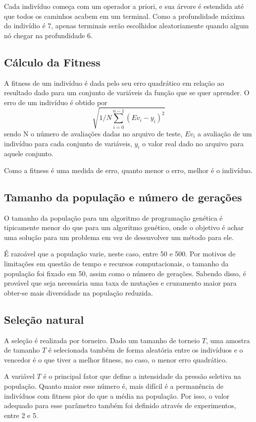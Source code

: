 \documentclass[11pt]{article}
\begin{document}
Cada indivíduo começa com um operador a priori, e sua árvore é estendida até que todos os caminhos acabem em um terminal. Como a profundidade máxima do indivídio é 7, apenas terminais serão escolhidos aleatoriamente quando algum nó chegar na profundidade 6.

\subsection*{Cálculo da Fitness}

A fitness de um indivíduo é dada pelo seu erro quadrático em relação ao resultado dado para um conjunto de variáveis da função que se quer aprender. O erro de um indivíduo é obtido por $$\sqrt{1/N\sum\limits_{i=0}^{n-1} (Ev_i - y_i)^2}$$ sendo N o número de avaliações dadas no arquivo de teste, $Ev_i$ a avaliação de um indivíduo para cada conjunto de variáveis, $y_i$ o valor real dado no arquivo para aquele conjunto.

Como a fitness é uma medida de erro, quanto menor o erro, melhor é o indivíduo.

\subsection*{Tamanho da população e número de gerações}

O tamanho da população para um algoritmo de programação genética é tipicamente menor do que para um algoritmo genético, onde o objetivo é achar uma solução para um problema em vez de desenvolver um método para ele.

É razoável que a população varie, neste caso, entre 50 e 500. Por motivos de limitações em questão de tempo e recursos computacionais, o tamanho da população foi fixado em 50, assim como o número de gerações. Sabendo disso, é provável que seja necessária uma taxa de mutações e cruzamento maior para obter-se mais diversidade na população reduzida.

\subsection*{Seleção natural}

A seleção é realizada por torneiro. Dado um tamanho de torneio $T$, uma amostra de tamanho $T$ é selecionada também de forma aleatória entre os indivíduos e o vencedor é o que tiver a melhor fitness, no caso, o menor erro quadrático. 

A variável $T$ é o principal fator que define a intensidade da pressão seletiva na população. Quanto maior esse número é, mais difícil é a permanência de indivíduos com fitness pior do que a média na população. Por isso, o valor adequado para esse parâmetro também foi definido através de experimentos, entre 2 e 5.
\end{document}
